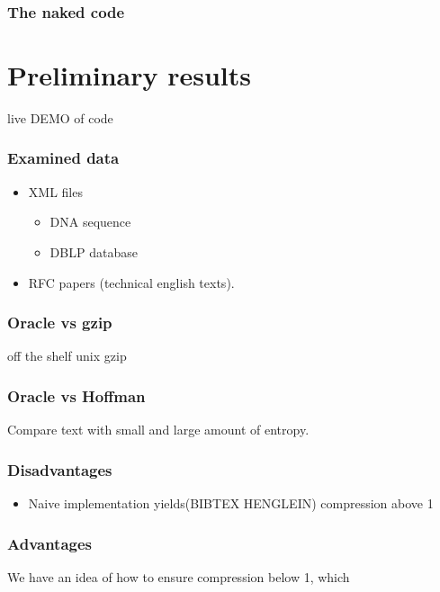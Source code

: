 \documentclass[slidestop,compress,mathserif, xcolor=table]{beamer}
\begin{document}
\begin{frame}
  \frametitle{The naked code}
  
\end{frame}

\section{Preliminary results}

\begin{frame}
  \begin{center}
    \huge{live DEMO of code}
  \end{center}
\end{frame}

\begin{frame}
  \frametitle{Examined data}
  \begin{itemize}
  \item XML files
    
    \begin{itemize}
    \item DNA sequence
      
    \item DBLP database
    \end{itemize}

  \item RFC papers (technical english texts).
    
  \end{itemize}
\end{frame}

\begin{frame}
  \frametitle{Oracle vs gzip}
  
  off the shelf unix gzip
\end{frame}

\begin{frame}
  \frametitle{Oracle vs Hoffman}
  Compare text with small and large amount of entropy.
\end{frame}

\begin{frame}
  \frametitle{Disadvantages}

  \begin{itemize}
  \item Naive implementation yields(BIBTEX HENGLEIN) compression above 1
  \end{itemize}

\end{frame}

\begin{frame}
  \frametitle{Advantages}

  We have an idea of how to ensure compression below 1, which
\end{frame}
\end{document}
